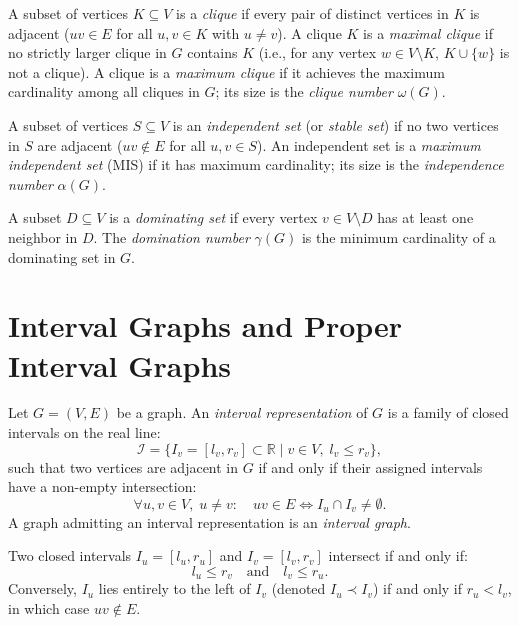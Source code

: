 A subset of vertices $K \subseteq V$ is a \emph{clique} if every pair of distinct vertices in $K$ is adjacent ($uv \in E$ for all $u, v \in K$ with $u \ne v$). A clique $K$ is a \emph{maximal clique} if no strictly larger clique in $G$ contains $K$ (i.e., for any vertex $w \in V \setminus K$, $K \cup \{w\}$ is not a clique). A clique is a \emph{maximum clique} if it achieves the maximum cardinality among all cliques in $G$; its size is the \emph{clique number} $\omega(G)$.

A subset of vertices $S \subseteq V$ is an \emph{independent set} (or \emph{stable set}) if no two vertices in $S$ are adjacent ($uv \notin E$ for all $u, v \in S$). An independent set is a \emph{maximum independent set} (MIS) if it has maximum cardinality; its size is the \emph{independence number} $\alpha(G)$.

A subset $D \subseteq V$ is a \emph{dominating set} if every vertex $v \in V \setminus D$ has at least one neighbor in $D$. The \emph{domination number} $\gamma(G)$ is the minimum cardinality of a dominating set in $G$.

\section{Interval Graphs and Proper Interval Graphs}
\label{sec:prelim_interval_graphs}

\begin{definition}
Let $G = (V, E)$ be a graph. An \emph{interval representation} of $G$ is a family of closed intervals on the real line:
\begin{equation}
    \mathcal{I} = \{ I_v = [l_v, r_v] \subset \mathbb{R} \mid v \in V, \; l_v \le r_v \},
\end{equation}
such that two vertices are adjacent in $G$ if and only if their assigned intervals have a non-empty intersection:
\begin{equation}
    \forall u, v \in V, \; u \ne v: \quad uv \in E \iff I_u \cap I_v \ne \emptyset.
\end{equation}
A graph admitting an interval representation is an \emph{interval graph}.
\end{definition}

Two closed intervals $I_u = [l_u, r_u]$ and $I_v = [l_v, r_v]$ intersect if and only if:
\begin{equation}
    l_u \le r_v \quad \text{and} \quad l_v \le r_u.
\end{equation}
Conversely, $I_u$ lies entirely to the left of $I_v$ (denoted $I_u \prec I_v$) if and only if $r_u < l_v$, in which case $uv \notin E$.

